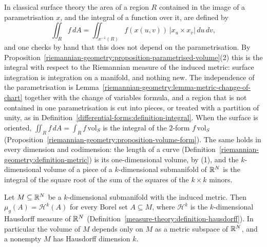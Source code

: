 \begin{remark}\label{riemannian-geometry:remark-surface-integrals}
In classical surface theory \cite[Chapter 2]{do-carmo-curves-surfaces} the area of a region $R$ contained in the image of a parametrisation $x$, and the integral of a
function over it, are defined by
\[
\iint_Rf\,dA = \iint_{x^{-1}(R)}f(x(u, v))\,|x_u \times x_v|\,du\,dv,
\]
and one checks by hand that this does not depend on the parametrisation. By Proposition~\ref{riemannian-geometry:proposition-parametrised-volume}(2) this is the
integral with respect to the Riemannian measure of the induced metric: surface integration is integration on a manifold, and nothing new. The independence of the
parametrisation is Lemma~\ref{riemannian-geometry:lemma-metric-change-of-chart} together with the change of variables formula, and a region that is not contained in
one parametrisation is cut into pieces, or treated with a partition of unity, as in Definition~\ref{differential-forms:definition-integral}. When the surface is oriented,
$\iint_Rf\,dA = \int_Rf\,\mathrm{vol}_S$ is the integral of the $2$-form $f\,\mathrm{vol}_S$ (Proposition~\ref{riemannian-geometry:proposition-volume-form}). The same
holds in every dimension and codimension: the length of a curve (Definition~\ref{riemannian-geometry:definition-metric}) is its one-dimensional volume, by (1), and the
$k$-dimensional volume of a piece of a $k$-dimensional submanifold of $\mathbb{R}^N$ is the integral of the square root of the sum of the squares of the $k \times k$ minors.
\end{remark}


\begin{proposition}\label{riemannian-geometry:proposition-hausdorff-measure}
Let $M \subseteq \mathbb{R}^N$ be a $k$-dimensional submanifold with the induced metric. Then $\mu_g(A) = \mathcal{H}^k(A)$ for every Borel set $A \subseteq M$, where $\mathcal{H}^k$ is the
$k$-dimensional Hausdorff measure of $\mathbb{R}^N$ (Definition~\ref{measure-theory:definition-hausdorff}). In particular the volume of $M$ depends only on $M$ as a metric subspace of $\mathbb{R}^N$, and a
nonempty $M$ has Hausdorff dimension $k$.
\end{proposition}

